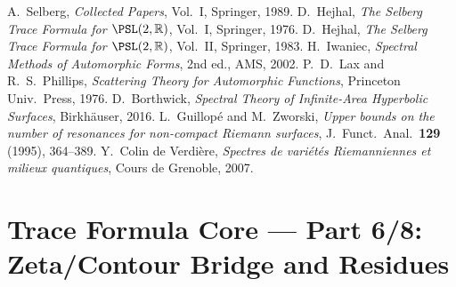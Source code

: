 \begin{thebibliography}{99} %
 A.~Selberg, \emph{Collected Papers}, Vol.~I, Springer, 1989. %
 D.~Hejhal, \emph{The Selberg Trace Formula for $\PSL(2,\mathbb{R})$}, Vol.~I, Springer, 1976. %
 D.~Hejhal, \emph{The Selberg Trace Formula for $\PSL(2,\mathbb{R})$}, Vol.~II, Springer, 1983. %
 H.~Iwaniec, \emph{Spectral Methods of Automorphic Forms}, 2nd ed., AMS, 2002. %
 P.~D.~Lax and R.~S.~Phillips, \emph{Scattering Theory for Automorphic Functions}, Princeton Univ.\ Press, 1976. %
 D.~Borthwick, \emph{Spectral Theory of Infinite-Area Hyperbolic Surfaces}, Birkhäuser, 2016. %
 L.~Guillopé and M.~Zworski, \emph{Upper bounds on the number of resonances for non-compact Riemann surfaces}, J.\ Funct.\ Anal.\ \textbf{129} (1995), 364–389. %
 Y.~Colin de Verdière, \emph{Spectres de variétés Riemanniennes et milieux quantiques}, Cours de Grenoble, 2007. %
\end{thebibliography}


\section*{Trace Formula Core — Part 6/8: Zeta/Contour Bridge and Residues}\relax\hspace{0pt}
\label{sec:tfc-part6} %

